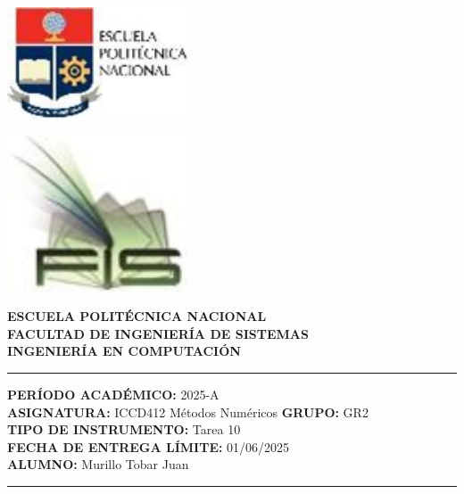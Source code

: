 \documentclass[12pt]{article}
\begin{document}
\begin{minipage}{0.45\textwidth}
    \includegraphics[width=0.4\textwidth]{inFiles/Figures/epnLogo.jpg}
\end{minipage}
\hfill
\begin{minipage}{0.45\textwidth}
    \raggedleft
    \includegraphics[width=0.4\textwidth]{inFiles/Figures/FIS_logo.jpg}
\end{minipage}

\vspace{0.5cm}

\begin{center}
    \textbf{ESCUELA POLITÉCNICA NACIONAL}\\[0.2cm]
    \textbf{FACULTAD DE INGENIERÍA DE SISTEMAS}\\[0.2cm]
    \textbf{INGENIERÍA {\textbf{EN COMPUTACIÓN}}}
\end{center}

\vspace{0.5cm}
\hrule
\vspace{0.5cm}

\noindent\textbf{PERÍODO ACADÉMICO:} 2025-A\\[0.2cm]
\noindent\textbf{ASIGNATURA:} ICCD412 Métodos Numéricos \hfill \textbf{GRUPO:} GR2\\[0.2cm]
\noindent\textbf{TIPO DE INSTRUMENTO:} Tarea 10\\[0.2cm]
\noindent\textbf{FECHA DE ENTREGA LÍMITE:} 01/06/2025\\[0.2cm]
\noindent\textbf{ALUMNO:} Murillo Tobar Juan

\vspace{0.5cm}
\hrule
\vspace{1cm}
\end{document}
